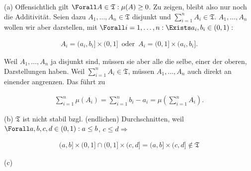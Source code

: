 \begin{solution}

(a) Offensichtlich gilt $\Forall A \in \mathfrak{T}: \mu(A) \geq 0$. Zu zeigen, bleibt also nur noch die Additivität. Seien dazu $A_1, \ldots, A_n \in \mathfrak{T}$ disjunkt und $\sum_{i=1}^n A_i \in \mathfrak{T}$. $A_1, \ldots, A_n$ wollen wir aber darstellen, mit $\Forall i = 1, \ldots, n: \Exists a_i, b_i \in (0, 1):$

\begin{align*}
  A_i = (a_i, b_i] \times (0, 1]
  \enspace \text{oder} \enspace
  A_i = (0, 1] \times (a_i, b_i].
\end{align*}

Weil $A_1, \ldots, A_n$ ja disjunkt sind, müssen sie aber alle die selbe, einer der oberen, Darstellungen haben. Weil $\sum_{i=1}^n A_i \in \mathfrak{T}$, müssen $A_1, \ldots, A_n$ auch direkt an einender angrenzen. Das führt zu

\begin{align*}
  \sum_{i=1}^n \mu(A_i)
  =
  \sum_{i=1}^n b_i - a_i
  =
  \mu(\sum_{i=1}^n A_i).
\end{align*}

(b) $\mathfrak{T}$ ist nicht stabil bzgl. (endlichen) Durchschnitten, weil $\Forall a, b, c, d \in (0, 1): a \leq b$, $c \leq d \Rightarrow$

\begin{align*}
  (a, b] \times (0, 1]
  \cap
  (0, 1] \times (c, d]
  =
  (a, b] \times (c, d]
  \notin \mathfrak{T}
\end{align*}

(c)

\end{solution}

